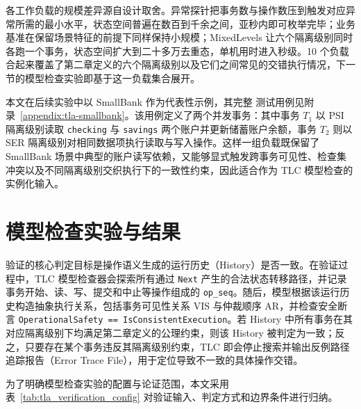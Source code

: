 各工作负载的规模差异源自设计取舍。异常探针把事务数与操作数压到触发对应异常所需的最小水平，状态空间普遍在数百到千余之间，亚秒内即可枚举完毕；业务基准在保留场景特征的前提下同样保持小规模；MixedLevels 让六个隔离级别同时各跑一个事务，状态空间扩大到二十多万去重态，单机用时进入秒级。10 个负载合起来覆盖了第二章定义的六个隔离级别以及它们之间常见的交错执行情况，下一节的模型检查实验即基于这一负载集合展开。

本文在后续实验中以 SmallBank 作为代表性示例，其完整 \TLAPlus 测试用例见附录~\ref{appendix:tla-smallbank}。该用例定义了两个并发事务：其中事务 $T_1$ 以 PSI 隔离级别读取 \texttt{checking} 与 \texttt{savings} 两个账户并更新储蓄账户余额，事务 $T_2$ 则以 SER 隔离级别对相同数据项执行读取与写入操作。这样一组负载既保留了 SmallBank 场景中典型的账户读写依赖，又能够显式触发跨事务可见性、检查集冲突以及不同隔离级别交织执行下的一致性约束，因此适合作为 TLC 模型检查的实例化输入。

\section{模型检查实验与结果}

验证的核心判定目标是操作语义生成的运行历史（History）是否一致。在验证过程中，TLC 模型检查器会探索所有通过 \texttt{Next} 产生的合法状态转移路径，并记录事务开始、读、写、提交和中止等操作组成的 \texttt{op\_seq}。随后，模型根据该运行历史构造抽象执行关系，包括事务可见性关系 $\mathrm{VIS}$ 与仲裁顺序 $\mathrm{AR}$，并检查安全断言 \texttt{OperationalSafety == IsConsistentExecution}。若 History 中所有事务在其对应隔离级别下均满足第二章定义的公理约束，则该 History 被判定为一致；反之，只要存在某个事务违反其隔离级别约束，TLC 即会停止搜索并输出反例路径追踪报告（Error Trace File），用于定位导致不一致的具体操作交错。

为了明确模型检查实验的配置与论证范围，本文采用表~\ref{tab:tla_verification_config} 对验证输入、判定方式和边界条件进行归纳。

